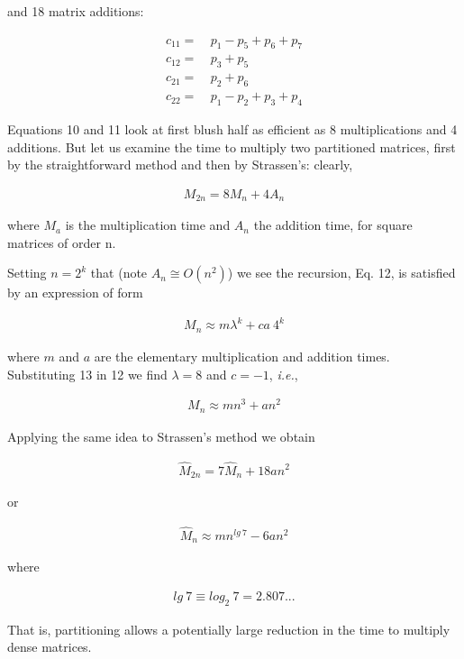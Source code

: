 and 18 matrix additions:

\begin{align}
    c_{11} =&\ p_{1} - p_{5} + p_{6} + p_{7} \\
    c_{12} =&\ p_{3} + p_{5}                 \\
    c_{21} =&\ p_{2} + p_{6}                 \\
    c_{22} =&\ p_{1} - p_{2} + p_{3} + p_{4}
\end{align}

Equations 10 and 11 look at first blush half as efficient as 8 multiplications and 4 additions. But let us examine the time to multiply two partitioned matrices, first by the straightforward method and then by Strassen's: clearly,

\begin{align}
    M_{2n} = 8M_{n} + 4A_{n}
\end{align}

where $M_{a}$ is the multiplication time and $A_{n}$ the addition time, for square matrices of order n.

Setting $n = 2^{k}$ that (note $A_{n} \cong O(n^{2})$) we see the recursion, Eq. 12, is satisfied by an expression of form

\begin{align}
    M_{n} \approx m\lambda^{k} + ca\ 4^{k}
\end{align}

where $m$ and $a$ are the elementary multiplication and addition times. Substituting 13 in 12 we find $\lambda = 8$ and $c = -1$, \textit{i.e.},

\begin{align}
    M_{n} \approx mn^{3} + an^{2}
\end{align}

Applying the same idea to Strassen’s method we obtain

\begin{align}
    \hat{M}_{2n} = 7\hat{M}_{n} + 18an^{2}
\end{align}

or

\begin{align}
    \hat{M}_{n} \approx mn^{lg\ 7} - 6an^{2}
\end{align}

where

\begin{align}
    lg\ 7 \equiv log_{2}\ 7 = 2.807...
\end{align}

That is, partitioning allows a potentially large reduction in the time to multiply dense matrices.


